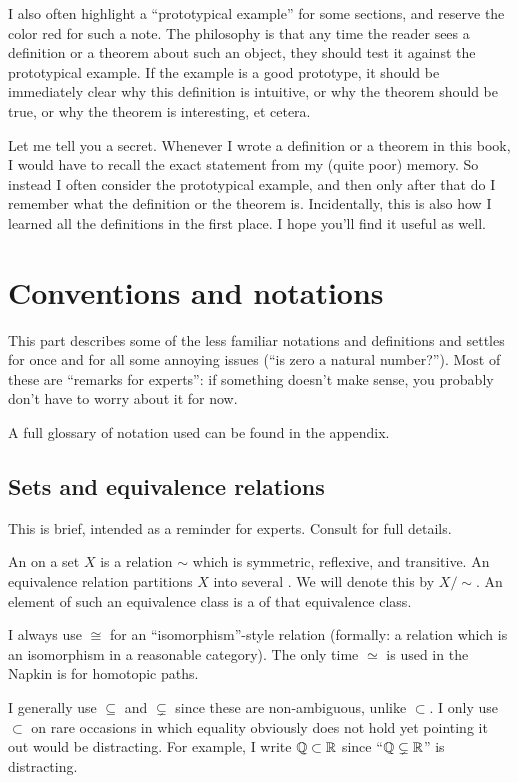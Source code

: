 I also often highlight a ``prototypical example'' for some sections,
and reserve the color red for such a note.
The philosophy is that any time the reader sees a definition
or a theorem about such an object, they should test it
against the prototypical example.
If the example is a good prototype, it should be immediately clear
why this definition is intuitive, or why the theorem should be true,
or why the theorem is interesting, et cetera.

Let me tell you a secret.  Whenever I wrote a definition or a theorem in this book,
I would have to recall the exact statement from my (quite poor) memory.
So instead I often consider the prototypical example,
and then only after that do I remember what the definition or the theorem is.
Incidentally, this is also how I learned all the definitions in the first place.
I hope you'll find it useful as well.

\section{Conventions and notations}
This part describes some of the less familiar notations and definitions
and settles for once and for all some annoying issues (``is zero a natural number?'').
Most of these are ``remarks for experts'':
if something doesn't make sense, you probably don't have to worry about it for now.

A full glossary of notation used can be found in the appendix.

\subsection{Sets and equivalence relations}
This is brief, intended as a reminder for experts.
Consult  for full details.

An  on a set $X$ is a relation $\sim$
which is symmetric, reflexive, and transitive.
An equivalence relation partitions $X$
into several .
We will denote this by $X / {\sim}$.
An element of such an equivalence class is a
 of that equivalence class.

I always use $\cong$ for an ``isomorphism''-style relation
(formally: a relation which is an isomorphism in a reasonable category).
The only time $\simeq$ is used in the Napkin is for homotopic paths.

I generally use $\subseteq$ and $\subsetneq$ since these are non-ambiguous,
unlike $\subset$.  I only use $\subset$ on rare occasions in which equality
obviously does not hold yet pointing it out would be distracting.
For example, I write $\mathbb Q \subset \mathbb R$
since ``$\mathbb Q \subsetneq \mathbb R$'' is distracting.

